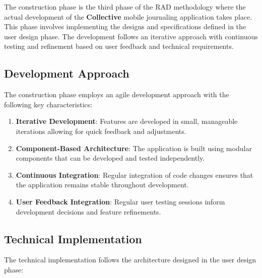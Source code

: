 The construction phase is the third phase of the RAD methodology where the actual development of the \textbf{Collective} mobile journaling application takes place. This phase involves implementing the designs and specifications defined in the user design phase. The development follows an iterative approach with continuous testing and refinement based on user feedback and technical requirements.

\subsection{Development Approach}\label{subsec:developmentApproach}

The construction phase employs an agile development approach with the following key characteristics:

\begin{enumerate}
    \item \textbf{Iterative Development}: Features are developed in small, manageable iterations allowing for quick feedback and adjustments.
    
    \item \textbf{Component-Based Architecture}: The application is built using modular components that can be developed and tested independently.
    
    \item \textbf{Continuous Integration}: Regular integration of code changes ensures that the application remains stable throughout development.
    
    \item \textbf{User Feedback Integration}: Regular user testing sessions inform development decisions and feature refinements.
\end{enumerate}

\subsection{Technical Implementation}\label{subsec:technicalImplementation}

The technical implementation follows the architecture designed in the user design phase:

